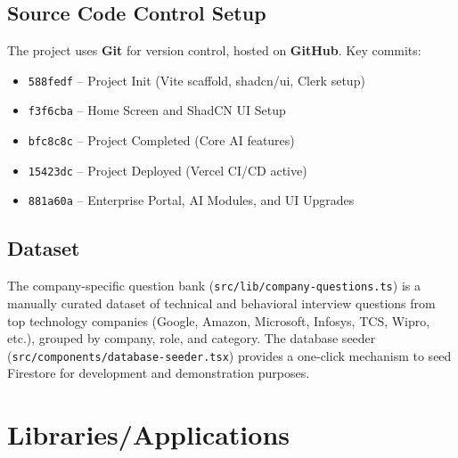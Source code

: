 \documentclass{fisatprojectfinal}
\begin{document}
\subsection{Source Code Control Setup}
The project uses \textbf{Git} for version control, hosted on \textbf{GitHub}. Key commits:
\begin{itemize}
  \item \texttt{588fedf} -- Project Init (Vite scaffold, shadcn/ui, Clerk setup)
  \item \texttt{f3f6cba} -- Home Screen and ShadCN UI Setup
  \item \texttt{bfc8c8c} -- Project Completed (Core AI features)
  \item \texttt{15423dc} -- Project Deployed (Vercel CI/CD active)
  \item \texttt{881a60a} -- Enterprise Portal, AI Modules, and UI Upgrades
\end{itemize}

\subsection{Dataset}
The company-specific question bank (\texttt{src/lib/company-questions.ts}) is a manually
curated dataset of technical and behavioral interview questions from top technology companies
(Google, Amazon, Microsoft, Infosys, TCS, Wipro, etc.), grouped by company, role, and
category. The database seeder (\texttt{src/components/database-seeder.tsx}) provides a
one-click mechanism to seed Firestore for development and demonstration purposes.

\section{Libraries/Applications}
\end{document}

